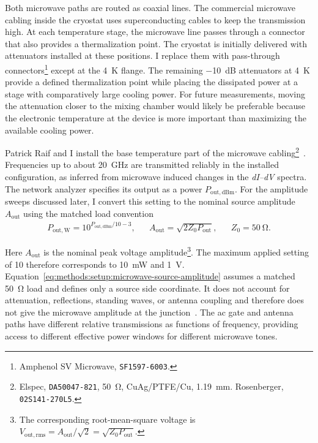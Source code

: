             Both microwave paths are routed as coaxial lines. The commercial microwave cabling inside the cryostat uses superconducting cables to keep the transmission high. At each temperature stage, the microwave line passes through a connector that also provides a thermalization point. The cryostat is initially delivered with attenuators installed at these positions. I replace them with pass-through connectors\footnote{Amphenol SV Microwave, \texttt{SF1597-6003}.} except at the \qty{4}{\kelvin} flange. The remaining \qty{-10}{\deci\bel} attenuators at \qty{4}{\kelvin} provide a defined thermalization point while placing the dissipated power at a stage with comparatively large cooling power. For future measurements, moving the attenuation closer to the mixing chamber would likely be preferable because the electronic temperature at the device is more important than maximizing the available cooling power.

            Patrick Raif and I install the base temperature part of the microwave cabling\footnote{Elspec, \texttt{DA50047-821}, \qty{50}{\ohm}, CuAg/PTFE/Cu, \qty{1.19}{\milli\meter}. Rosenberger, \texttt{02S141-270L5}.}~\cite{raif_electronic_2024}. Frequencies up to about \qty{20}{\giga\hertz} are transmitted reliably in the installed configuration, as inferred from microwave induced changes in the \textit{dI--dV} spectra. The network analyzer specifies its output as a power $P_\mathrm{out,dBm}$. For the amplitude sweeps discussed later, I convert this setting to the nominal source amplitude $A_\mathrm{out}$ using the matched load convention
            \begin{align}
                P_\mathrm{out, W}
                = 10^{P_\mathrm{out, dBm}/10-3},
                &&
                A_\mathrm{out}
                = \sqrt{2 Z_0 P_\mathrm{out}},
                &&
                Z_0=\qty{50}{\ohm}.
                \label{eq:methods:setup:microwave-source-amplitude}
            \end{align}
            
            Here $A_\mathrm{out}$ is the nominal peak voltage amplitude\footnote{The corresponding root-mean-square voltage is $V_\mathrm{out,rms}=A_\mathrm{out}/\sqrt{2}=\sqrt{Z_0P_\mathrm{out}}$.}. The maximum applied setting of \qty{10}{\dBm} therefore corresponds to \qty{10}{\milli\watt} and \qty{1}{\volt}. Equation~\eqref{eq:methods:setup:microwave-source-amplitude} assumes a matched \qty{50}{\ohm} load and defines only a source side coordinate. It does not account for attenuation, reflections, standing waves, or antenna coupling and therefore does not give the microwave amplitude at the junction~\cite{pozar_microwave_2011}. The ac gate and antenna paths have different relative transmissions as functions of frequency, providing access to different effective power windows for different microwave tones.


